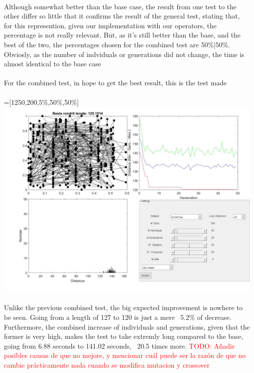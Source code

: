 \\
Although somewhat better than the base case, the result from one test to the
other differ so little that it confirms the result of the general test, stating
that, for this represention, given our implementation with our
operators, the percentage is not really relevant. But, as it's still better
than the base, and the best of the two, the percentages chosen for the combined
test are 50\%|50\%. Obviosly, as the number of indviduals or
generations did not change, the time is almost identical to the base case\\
\\
For the combined test, in hope to get the best result, this is the test made\\
\\
 =[1250,200,5\%,50\%,50\%]\\
\includegraphics[width=\textwidth]{img/specific/order_crossover/general_7.jpg}\\
\\
Unlike the previous combined test, the big expected improvement is nowhere
to be seen. Going from a length of 127 to 120 is just a mere ~5.2\% of
decrease. Furthermore, the combined increase of individuals and
generations, given that the former is very high, makes the test to take extremly
long compared to the base, going from 6.88 seconds to 141.02 seconds, ~20.5
times more. 
\textcolor{red}{TODO: Añadir posibles causas de que no mejore, y mencionar cuál
puede ser la razón de que no cambie prácticamente nada cuando se modifica
mutacion y crossover}



